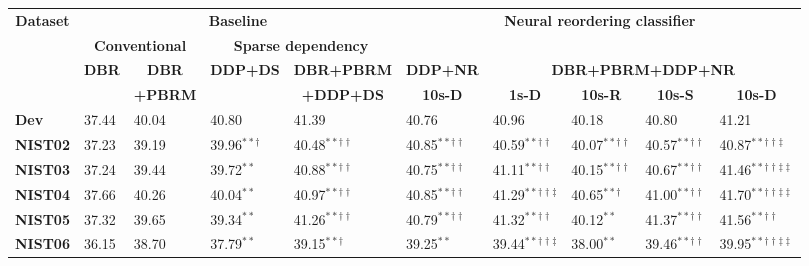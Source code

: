 \documentclass[letterpaper]{article}
\begin{document}
\begin{table}[ht]
\centering
\small
\begin{adjustbox}{width=0.65\columnwidth}
\begin{tabular}{|l|l|l||l|l||l|l|l|l|l|}
\hline
\multicolumn{1}{|c|}{\multirow{4}{*}{\bf Dataset}} & \multicolumn{4}{c||}{\bf Baseline} & \multicolumn{5}{c|}{\multirow{2}{*}{\bf Neural reordering classifier}} \\\cline{2-5}
 & \multicolumn{2}{c||}{\bf Conventional} & \multicolumn{2}{c||}{\bf Sparse dependency} &  \multicolumn{5}{c|}{} \\\cline{2-10}
 & \multicolumn{1}{c|}{\multirow{2}{*}{\bf DBR}} & \multicolumn{1}{c||}{\bf DBR} & \multicolumn{1}{c|}{\multirow{2}{*}{\bf DDP+DS}} & \multicolumn{1}{c||}{\bf DBR+PBRM} & \multicolumn{1}{c|}{\bf DDP+NR} & \multicolumn{4}{c|}{\bf DBR+PBRM+DDP+NR} \\\cline{6-10}
 & & \multicolumn{1}{c||}{\bf +PBRM} & & \multicolumn{1}{c||}{\bf +DDP+DS} & \multicolumn{1}{c|}{\bf 10s-D} & \multicolumn{1}{c|}{\bf 1s-D} & \multicolumn{1}{c|}{\bf 10s-R} & \multicolumn{1}{c|}{\bf 10s-S} & \multicolumn{1}{c|}{\bf 10s-D}\\
\hline\hline
{\bf Dev} & 37.44 & 40.04 & 40.80 & 41.39 & 40.76 & 40.96 & 40.18 & 40.80 & 41.21\\\hline
\hline
{\bf NIST02} & 37.23 & 39.19 & 39.96$^{**\dagger}$ & 40.48$^{**\dagger\dagger}$ & 40.85$^{**\dagger\dagger}$ & 40.59$^{**\dagger\dagger}$ & 40.07$^{**\dagger\dagger}$ & 40.57$^{**\dagger\dagger}$ & 40.87$^{**\dagger\dagger\ddagger}$\\\hline
{\bf NIST03} & 37.24 & 39.44 & 39.72$^{**}$ & 40.88$^{**\dagger\dagger}$ & 40.75$^{**\dagger\dagger}$ & 41.11$^{**\dagger\dagger}$ & 40.15$^{**\dagger\dagger}$ & 40.67$^{**\dagger\dagger}$ & 41.46$^{**\dagger\dagger\ddagger\ddagger}$\\\hline
{\bf NIST04} & 37.66 & 40.26 & 40.04$^{**}$ & 40.97$^{**\dagger\dagger}$ & 40.85$^{**\dagger\dagger}$ & 41.29$^{**\dagger\dagger\ddagger}$ & 40.65$^{**\dagger}$ & 41.00$^{**\dagger\dagger}$ & 41.70$^{**\dagger\dagger\ddagger\ddagger}$\\\hline
{\bf NIST05} & 37.32 & 39.65 & 39.34$^{**}$ & 41.26$^{**\dagger\dagger}$ & 40.79$^{**\dagger\dagger}$ & 41.32$^{**\dagger\dagger}$ & 40.12$^{**}$ & 41.37$^{**\dagger\dagger}$ & 41.56$^{**\dagger\dagger}$\\\hline
{\bf NIST06} & 36.15 & 38.70 & 37.79$^{**}$ & 39.15$^{**\dagger}$ & 39.25$^{**}$ & 39.44$^{**\dagger\dagger\ddagger}$ & 38.00$^{**}$ & 39.46$^{**\dagger\dagger}$ & 39.95$^{**\dagger\dagger\ddagger\ddagger}$\\\hline

\end{tabular}
\end{adjustbox}
\end{table}
\end{document}
